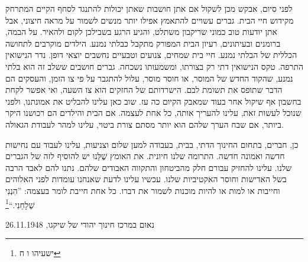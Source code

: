 \documentclass[14pt, article, extrafontsizes, twopage, a4paper]{memoir}
\newcommand{\attr}[1]{
  \vspace*{.25\baselineskip}
  {\raggedright\smaller#1


  }
}
\begin{document}
{לפני סיום, אבקש מכן לשקול אם
אתן חושבות שאתן יכולות להתנגד לסחף הקיים המתרחק מקידוש חיי הבית. גברים עשויים להתאמץ אפילו יותר
מנשים לשמור על מראה חיצוני, אבל אתן יודעות טוב כמוני
שריקבון משתלט, והגיע הרגע
בשבילכן לקום ולהאיר. על הבמה,
ברומנים ובעיתונים, רעיון הבית המפורק
מתקבל כבלתי נמנע. הילדים מוקרבים
לתחושה הכללית של הבלתי נמנע.
חיי בית שמחים, צנועים וטבעיים נחשבים
יוצאי דופן. נדר הנישואין התרפה.
טקס הנישואין דתי רק בצורתו,
ומשמעותו נשכחה. גברים חושבים
ששלב זה הוא בלתי נמנע, שהקוד החדש של המוסר, או
חוסר מוסר, עלול להתגבר על פי צו הזמן, והעסקים הם הדבר שתופס את תשומת לבם. הישרדותם של החזקים
הוא צו השעה, ואי אפשר לקחת בחשבון אף שיקול אחר
בעוד שמאבק הקיום כה עז. שוב כאן
עלינו להבליט את אמונתנו, ולפני שנוכל לעשות זאת, עלינו להעריך אותה,
כל אחת לעצמה. אם הבית והילדים
הם רכושנו היקר ביותר, אם שבח
הערך שלהם הוא יותר מסתם צורת ביטוי, עלינו
למהר לעבודת הגאולה.

כן, חברים, בתחום החינוך הדתי, בבית,
בעבודה למען שלום וצניעות, עלינו לעבוד עם
נחישות חדשה ואמונה חדשה. התרומה שלנו חיונית. את האומץ שֶׁלָּנוּ
יש להוסיף לזה של הגברים שלנו. עלינו להחזיק
עבורם חלק מהביטחון והתקווה האבודים שלהם. נתנו
להם לאבד הרבה בשל האדישות וחוסר האקטיביות שלנו. עכשיו עלינו
לדעת שאנחנו עומדות לפני האלוהים וחייבות או למות
או להיות מוכנות לשמור את דברו. כל אחת חייבת לומר
בעצמה: ”הִנְנִי שְׁלָחֵנִי.“\footnote{ישעיהו ו ח}

\attr{נאום במרכז חינוך יהודי של שיקגו, 26.11.1948}
}
\clearpage
\end{document}
